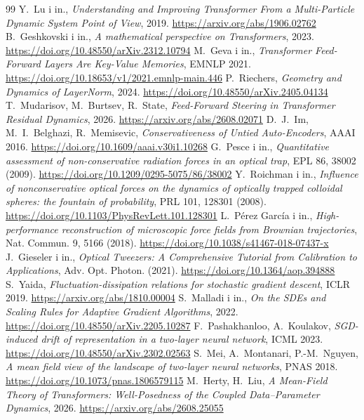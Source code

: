 \documentclass[a4paper,11pt]{article}
\begin{document}
\begin{thebibliography}{99}\small
{} Y.~Lu i in., \emph{Understanding and Improving Transformer From a Multi-Particle Dynamic System Point of View}, 2019. \url{https://arxiv.org/abs/1906.02762}
 B.~Geshkovski i in., \emph{A mathematical perspective on Transformers}, 2023. \url{https://doi.org/10.48550/arXiv.2312.10794}
 M.~Geva i in., \emph{Transformer Feed-Forward Layers Are Key-Value Memories}, EMNLP 2021. \url{https://doi.org/10.18653/v1/2021.emnlp-main.446}
 P.~Riechers, \emph{Geometry and Dynamics of LayerNorm}, 2024. \url{https://doi.org/10.48550/arXiv.2405.04134}
 T.~Mudarisov, M.~Burtsev, R.~State, \emph{Feed-Forward Steering in Transformer Residual Dynamics}, 2026. \url{https://arxiv.org/abs/2608.02071}
 D.~J.~Im, M.~I.~Belghazi, R.~Memisevic, \emph{Conservativeness of Untied Auto-Encoders}, AAAI 2016. \url{https://doi.org/10.1609/aaai.v30i1.10268}
 G.~Pesce i in., \emph{Quantitative assessment of non-conservative radiation forces in an optical trap}, EPL 86, 38002 (2009). \url{https://doi.org/10.1209/0295-5075/86/38002}
 Y.~Roichman i in., \emph{Influence of nonconservative optical forces on the dynamics of optically trapped colloidal spheres: the fountain of probability}, PRL 101, 128301 (2008). \url{https://doi.org/10.1103/PhysRevLett.101.128301}
 L.~Pérez García i in., \emph{High-performance reconstruction of microscopic force fields from Brownian trajectories}, Nat. Commun. 9, 5166 (2018). \url{https://doi.org/10.1038/s41467-018-07437-x}
 J.~Gieseler i in., \emph{Optical Tweezers: A Comprehensive Tutorial from Calibration to Applications}, Adv. Opt. Photon. (2021). \url{https://doi.org/10.1364/aop.394888}
 S.~Yaida, \emph{Fluctuation-dissipation relations for stochastic gradient descent}, ICLR 2019. \url{https://arxiv.org/abs/1810.00004}
 S.~Malladi i in., \emph{On the SDEs and Scaling Rules for Adaptive Gradient Algorithms}, 2022. \url{https://doi.org/10.48550/arXiv.2205.10287}
 F.~Pashakhanloo, A.~Koulakov, \emph{SGD-induced drift of representation in a two-layer neural network}, ICML 2023. \url{https://doi.org/10.48550/arXiv.2302.02563}
 S.~Mei, A.~Montanari, P.-M.~Nguyen, \emph{A mean field view of the landscape of two-layer neural networks}, PNAS 2018. \url{https://doi.org/10.1073/pnas.1806579115}
 M.~Herty, H.~Liu, \emph{A Mean-Field Theory of Transformers: Well-Posedness of the Coupled Data--Parameter Dynamics}, 2026. \url{https://arxiv.org/abs/2608.25055}
\end{thebibliography}
\end{document}

